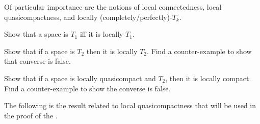 Of particular importance are the notions of local connectedness, local quasicompactness, and locally (completely/perfectly)-$T_k$.
\begin{exr}{}{}
Show that a space is $T_1$ iff it is locally $T_1$.
\end{exr}
\begin{exr}{}{}
Show that if a space is $T_2$ then it is locally $T_2$.  Find a counter-example to show that converse is false.
\end{exr}
\begin{exr}{}{}
Show that if a space is locally quasicompact and $T_2$, then it is locally compact.  Find a counter-example to show the converse is false.
\end{exr}
The following is the result related to local quasicompactness that will be used in the proof of the .
